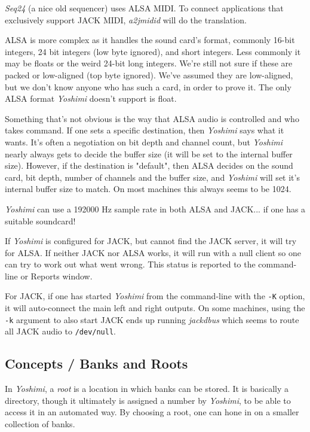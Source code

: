    \textsl{Seq24} (a nice old sequencer) uses ALSA MIDI. To connect
   applications that exclusively support JACK MIDI, \textsl{a2jmidid} will
   do the translation.

   ALSA is more complex as it handles the sound card's format, commonly
   16-bit integers, 24 bit integers (low byte ignored), and short integers.
   Less commonly it may be floats or the weird 24-bit long integers. We're
   still not sure if these are packed or low-aligned (top byte ignored). We've
   assumed they are low-aligned, but we don't know anyone who has such a card,
   in order to prove it.  The only ALSA format
   \textsl{Yoshimi} doesn't support is float.

   Something that's not obvious is the way that ALSA audio is controlled and who
   takes command.  If one sets a specific destination, then \textsl{Yoshimi}
   says what it wants. It's often a negotiation on bit depth and channel count,
   but \textsl{Yoshimi} nearly always gets to decide the buffer size (it will be
   set to the internal buffer size).  However, if the destination is "default",
   then ALSA decides on the sound card, bit depth, number of channels and the
   buffer size, and \textsl{Yoshimi} will set it's internal buffer size to
   match.  On most machines this always seems to be 1024.

   \textsl{Yoshimi} can use a 192000 Hz sample
   rate in both ALSA and JACK... if one has a suitable soundcard!

   If \textsl{Yoshimi} is configured for JACK, but cannot find the JACK server,
   it will try for ALSA. If neither JACK nor ALSA works, it will run with a null
   client so one can try to work out what went wrong.
   This status is reported to the command-line or Reports window.

   For JACK, if one has started \textsl{Yoshimi}
   from the command-line with the \texttt{-K} option, it will
   auto-connect the main left and right outputs.
   On some machines, using the \texttt{-k} argument to also start JACK
   ends up running \textsl{jackdbus} which seems to route all JACK audio
   to \texttt{/dev/null}.

\subsection{Concepts / Banks and Roots}
\label{subsec:concepts_banks_and_roots}

   In \textsl{Yoshimi}, a \textsl{root} is a location in which banks can be
   stored.  It is basically a directory, though it ultimately is assigned a
   number by \textsl{Yoshimi}, to be able to access it in an
   automated way.  By choosing a root, one can hone in on a smaller
   collection of banks.

